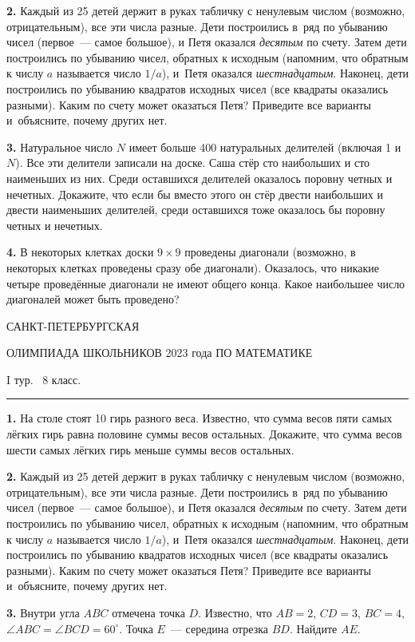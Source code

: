\documentclass[12pt]{article}
\def\q#1.{{\bf #1. }}
\begin{document}
\q2. Каждый из 25 детей держит в руках табличку с ненулевым числом (возможно, отрицательным), все эти числа разные. Дети построились в~ряд по убыванию чисел (первое~--- самое большое), и Петя оказался \emph{десятым} по счету. Затем дети построились по убыванию чисел, обратных к исходным (напомним, что обратным к числу $a$ называется число $1/a$), и~Петя оказался \emph{шестнадцатым}. Наконец, дети построились по убыванию квадратов исходных чисел (все квадраты оказались разными). Каким по счету может оказаться Петя? Приведите все варианты и~объясните, почему других нет.

\q3. Натуральное число $N$ имеет больше 400 натуральных делителей (включая 1 и $N$). Все эти делители записали на доске. Саша стёр сто наибольших и сто наименьших из них. Среди оставшихся делителей оказалось поровну четных и нечетных. Докажите, что если бы вместо этого он стёр двести наибольших и двести наименьших делителей, среди оставшихся тоже оказалось бы поровну четных и нечетных.

\q4. В некоторых клетках доски $9 \times 9$ проведены диагонали (возможно, в некоторых клетках проведены сразу обе диагонали). Оказалось, что никакие четыре проведённые диагонали не имеют общего конца. Какое наибольшее число диагоналей может быть проведено?


\clearpage

\centerline{\sc САНКТ-ПЕТЕРБУРГСКАЯ}
\centerline{\sc ОЛИМПИАДА ШКОЛЬНИКОВ 2023 года ПО МАТЕМАТИКЕ}
\centerline{\sc I тур. \ 8 класс.}
\medskip
\hrule
\bigskip

\q1. На столе стоят 10 гирь разного веса. Известно, что сумма весов пяти самых лёгких гирь равна половине суммы весов остальных. Докажите, что сумма весов шести самых лёгких гирь меньше суммы весов остальных.

\q2. Каждый из 25 детей держит в руках табличку с ненулевым числом (возможно, отрицательным), все эти числа разные. Дети построились в~ряд по убыванию чисел (первое~--- самое большое), и Петя оказался \emph{десятым} по счету. Затем дети построились по убыванию чисел, обратных к исходным (напомним, что обратным к числу $a$ называется число $1/a$), и~Петя оказался \emph{шестнадцатым}. Наконец, дети построились по убыванию квадратов исходных чисел (все квадраты оказались разными). Каким по счету может оказаться Петя? Приведите все варианты и~объясните, почему других нет.

\q3. Внутри угла $ABC$ отмечена точка $D$. Известно, что $AB=2$, $CD=3$, $BC=4$, $\angle ABC=\angle BCD=60^\circ$. Точка $E$~--- середина отрезка $BD$. Найдите $AE$.
\end{document}
